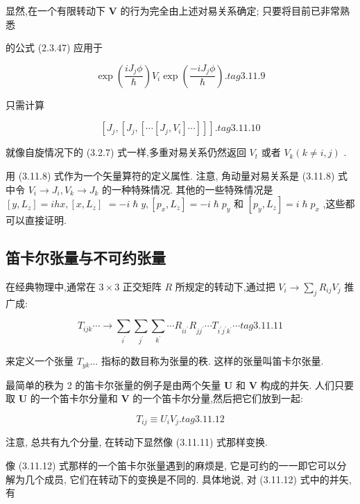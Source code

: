 显然,在一个有限转动下 $\mathbf{V}$ 的行为完全由上述对易关系确定; 只要将目前已非常熟悉

的公式 (2.3.47) 应用于

$$
\exp \left( \frac{i{J}_{j}\phi }{\hslash }\right) {V}_{i}\exp \left( \frac{-i{J}_{j}\phi }{\hslash }\right) . tag{3.11.9}
$$

只需计算

$$
\left\lbrack {{J}_{j},\left\lbrack {{J}_{j},\left\lbrack {\cdots \left\lbrack {{J}_{j},{V}_{i}}\right\rbrack \cdots }\right\rbrack }\right\rbrack }\right\rbrack \text{.} tag{3.11.10}
$$

就像自旋情况下的 (3.2.7) 式一样,多重对易关系仍然返回 ${V}_{t}$ 或者 ${V}_{k}\left( {k \neq i, j}\right)$ .

用 (3.11.8) 式作为一个矢量算符的定义属性. 注意, 角动量对易关系是 (3.11.8) 式中令 ${V}_{i} \rightarrow {J}_{i},{V}_{k} \rightarrow {J}_{k}$ 的一种特殊情况. 其他的一些特殊情况是 $\left\lbrack {y,{L}_{z}}\right\rbrack = {ihx},\left\lbrack {x,{L}_{z}}\right\rbrack$ $= - i\hslash y,\left\lbrack {{p}_{x},{L}_{z}}\right\rbrack = - i\hslash {p}_{y}$ 和 $\left\lbrack {{p}_{y},{L}_{z}}\right\rbrack = i\hslash {p}_{x}$ ,这些都可以直接证明.

\subsection{笛卡尔张量与不可约张量}

在经典物理中,通常在 $3 \times 3$ 正交矩阵 $R$ 所规定的转动下,通过把 ${V}_{i} \rightarrow {\sum }_{j}{R}_{ij}{V}_{j}$ 推广成:

$$
{T}_{ijk}\cdots \rightarrow \mathop{\sum }\limits_{{i}^{\prime }}\mathop{\sum }\limits_{{j}^{\prime }}\mathop{\sum }\limits_{{k}^{\prime }}\cdots {R}_{i{i}^{\prime }}{R}_{j{j}^{\prime }}\cdots {T}_{{i}^{\prime }{j}^{\prime }{k}^{\prime }}\cdots tag{3.11.11}
$$

来定义一个张量 ${T}_{yk}\ldots$ 指标的数目称为张量的秩. 这样的张量叫笛卡尔张量.

最简单的秩为 2 的笛卡尔张量的例子是由两个矢量 $\mathbf{U}$ 和 $\mathbf{V}$ 构成的并矢. 人们只要取 $\mathbf{U}$ 的一个笛卡尔分量和 $\mathbf{V}$ 的一个笛卡尔分量,然后把它们放到一起:

$$
{T}_{ij} \equiv {U}_{i}{V}_{j}. tag{3.11.12}
$$

注意, 总共有九个分量, 在转动下显然像 (3.11.11) 式那样变换.

像 (3.11.12) 式那样的一个笛卡尔张量遇到的麻烦是, 它是可约的一一即它可以分解为几个成员, 它们在转动下的变换是不同的. 具体地说, 对 (3.11.12) 式中的并矢, 有

